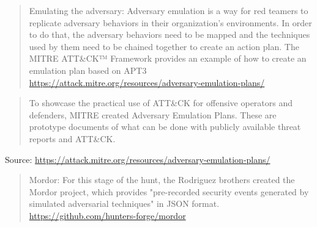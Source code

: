 \documentclass[Screen16to9,17pt]{foils}
\begin{document}

\begin{quote}
Emulating the adversary: Adversary emulation is a way for red teamers to
replicate adversary behaviors in their organization's environments. In order to
do that, the adversary behaviors need to be mapped and the techniques used by
them need to be chained together to create an action plan. The MITRE ATT\&CK™
Framework provides an example of how to create an emulation plan based on APT3\\
\url{https://attack.mitre.org/resources/adversary-emulation-plans/}
\end{quote}



\begin{quote}
To showcase the practical use of ATT\&CK for offensive operators and defenders, MITRE created Adversary Emulation Plans. These are prototype documents of what can be done with publicly available threat reports and ATT\&CK.
\end{quote}
Source: \url{https://attack.mitre.org/resources/adversary-emulation-plans/}





\begin{quote}
Mordor: For this stage of the hunt, the Rodriguez brothers created the Mordor
project, which provides
"pre-recorded security events generated by simulated adversarial techniques" in
JSON format.\\
 \url{https://github.com/hunters-forge/mordor}
\end{quote}









\end{document}

